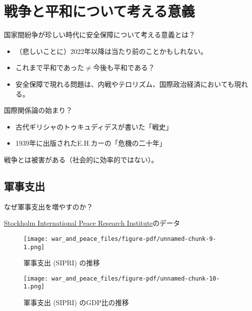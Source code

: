 \documentclass[
  xelatex,
  ja=standard]{bxjsarticle}
\providecommand{\tightlist}{%
  \setlength{\itemsep}{0pt}\setlength{\parskip}{0pt}}\usepackage{longtable,booktabs,array}
\begin{document}
\hypertarget{ux6226ux4e89ux3068ux5e73ux548cux306bux3064ux3044ux3066ux8003ux3048ux308bux610fux7fa9}{%
\section{戦争と平和について考える意義}\label{ux6226ux4e89ux3068ux5e73ux548cux306bux3064ux3044ux3066ux8003ux3048ux308bux610fux7fa9}}

国家間紛争が珍しい時代に安全保障について考える意義とは？

\begin{itemize}
\tightlist
\item
  （悲しいことに）2022年以降は当たり前のことかもしれない。
\item
  これまで平和であった\(\neq\)今後も平和である？
\item
  安全保障で現れる問題は、内戦やテロリズム、国際政治経済においても現れる。
\end{itemize}

国際関係論の始まり？

\begin{itemize}
\tightlist
\item
  古代ギリシャのトゥキュディデスが書いた「戦史」\citep{thucydides2013}
\item
  1939年に出版されたE.H.カーの「危機の二十年」\citep{carr2011}
\end{itemize}

戦争とは被害がある（社会的に効率的ではない）。

\hypertarget{ux8ecdux4e8bux652fux51fa}{%
\subsection{軍事支出}\label{ux8ecdux4e8bux652fux51fa}}

なぜ軍事支出を増やすのか？

\href{https://sipri.org/}{Stockholm International Peace Research
Institute}のデータ

\begin{figure}[htpb]

{\centering \texttt{[image: war\_and\_peace\_files/figure-pdf/unnamed-chunk-9-1.png]}

}

\caption{軍事支出 (SIPRI) の推移}

\end{figure}

\begin{figure}[htpb]

{\centering \texttt{[image: war\_and\_peace\_files/figure-pdf/unnamed-chunk-10-1.png]}

}

\caption{軍事支出 (SIPRI) のGDP比の推移}

\end{figure}
\end{document}
